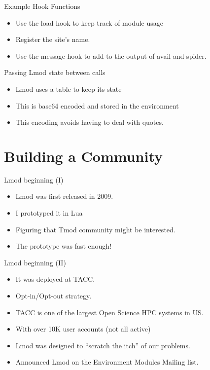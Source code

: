 \documentclass{beamer}
\begin{document}
\begin{frame}{Example Hook Functions}
  \begin{itemize}
    \item Use the load hook to keep track of module usage
    \item Register the site's name.
    \item Use the message hook to add to the output of avail and spider.
  \end{itemize}
\end{frame}

\begin{frame}{Passing Lmod state between calls}
  \begin{itemize}
    \item Lmod uses a table to keep its state
    \item This is base64 encoded and stored in the environment
    \item This encoding avoids having to deal with quotes.
  \end{itemize}
\end{frame}



\section{Building a Community}

\begin{frame}{Lmod beginning (I)}
  \begin{itemize}
    \item Lmod was first released in 2009.
    \item I prototyped it in Lua
    \item Figuring that Tmod community might be interested.
    \item The prototype was fast enough!
  \end{itemize}
\end{frame}

\begin{frame}{Lmod beginning (II)}
  \begin{itemize}
    \item It was deployed at TACC.
    \item Opt-in/Opt-out strategy.
    \item TACC is one of the largest Open Science HPC systems in US.
    \item With over 10K user accounts (not all active)
    \item Lmod was designed to ``scratch the itch'' of our problems.
    \item Announced Lmod on the Environment Modules Mailing list.
  \end{itemize}
\end{frame}
\end{document}
